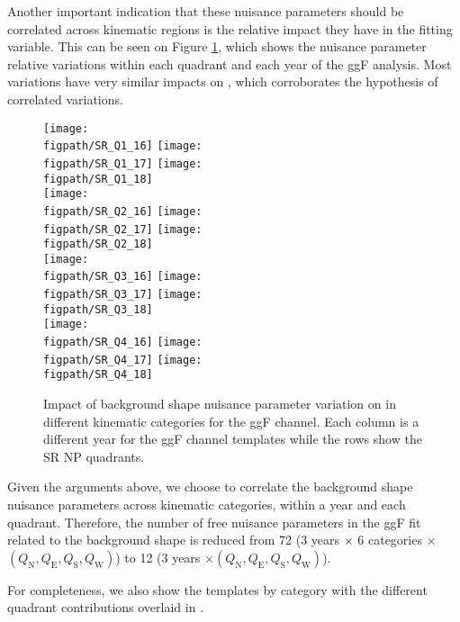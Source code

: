 Another important indication that these nuisance parameters should be correlated across kinematic regions is the relative impact they have in the \mhh fitting variable. 
This can be seen on Figure \ref{fig:sr-np-impact}, which shows the nuisance parameter relative variations within each quadrant and each year of the ggF analysis. 
Most variations have very similar impacts on \mhh , which corroborates the hypothesis of correlated variations. 

\def\figpath{figures/nr-int-note/unblind_results/V5/}
\begin{figure}[ht]
	\centering
	\texttt{[image: \\figpath/SR\_Q1\_16]}
	\texttt{[image: \\figpath/SR\_Q1\_17]}
	\texttt{[image: \\figpath/SR\_Q1\_18]}
	\\
	\texttt{[image: \\figpath/SR\_Q2\_16]}
	\texttt{[image: \\figpath/SR\_Q2\_17]}
	\texttt{[image: \\figpath/SR\_Q2\_18]}
	\\
	\texttt{[image: \\figpath/SR\_Q3\_16]}
	\texttt{[image: \\figpath/SR\_Q3\_17]}
	\texttt{[image: \\figpath/SR\_Q3\_18]}
	\\
	\texttt{[image: \\figpath/SR\_Q4\_16]}
	\texttt{[image: \\figpath/SR\_Q4\_17]}
	\texttt{[image: \\figpath/SR\_Q4\_18]}
	\caption{Impact of background shape nuisance parameter variation on \mhh in different kinematic categories for the ggF channel. Each column is a different year for the ggF channel templates while the rows show the SR NP quadrants.}	 
	\label{fig:sr-np-impact}
\end{figure}

\FloatBarrier

Given the arguments above, we choose to correlate the background shape nuisance parameters across kinematic categories, within a year and each quadrant. 
Therefore, the number of free nuisance parameters in the ggF fit related to the background shape is reduced from 72 (3 years $\times$ 6 categories $\times$ $ (Q_{\text{N}}, Q_{\text{E}}, Q_{\text{S}}, Q_{\text{W}})$)  to 12 (3 years $\times (Q_{\text{N}}, Q_{\text{E}}, Q_{\text{S}}, Q_{\text{W}})$). 

For completeness, we also show the templates by category with the different quadrant contributions overlaid in \Fig{\ref{fig:sr-np-impact-by-cat}}.

